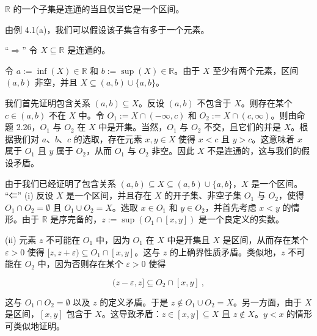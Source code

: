 \begin{theorem}

$ \mathbb{R} $ 的一个子集是连通的当且仅当它是一个区间。

\proofhead
由例 4.1(a)，我们可以假设该子集含有多于一个元素。

“$\Rightarrow$” 令 $X \subseteq \mathbb{R}$ 是连通的。

\begin{subitems}
\item

令 $ a := \inf(X) \in \mathbb{R} $ 和 $ b := \sup(X) \in \mathbb{R} $。由于 $ X $ 至少有两个元素，区间 $ (a, b) $ 非空，并且 $ X \subseteq (a, b) \cup \{a, b\} $。

\item

我们首先证明包含关系 $(a,b) \subseteq X$。反设 $(a,b)$ 不包含于 $X$。则存在某个 $c \in (a,b)$ 不在 $X$ 中。令 $O_1 := X \cap (-\infty, c)$ 和 $O_2 := X \cap (c, \infty)$。则由命题 2.26，$O_1$ 与 $O_2$ 在 $X$ 中是开集。当然，$O_1$ 与 $O_2$ 不交，且它们的并是 $X$。根据我们对 $a$、$b$、$c$ 的选取，存在元素 $x, y \in X$ 使得 $x < c$ 且 $y > c$。这意味着 $x$ 属于 $O_1$ 且 $y$ 属于 $O_2$，从而 $O_1$ 与 $O_2$ 非空。因此 $X$ 不是连通的，这与我们的假设矛盾。

\item

由于我们已经证明了包含关系 $(a,b)\subseteq X\subseteq(a,b)\cup\{a,b\}$，$X$ 是一个区间。
“⇐” (i) 反设 $X$ 是一个区间，并且存在 $X$ 的开子集、非空子集 $O_1$ 与 $O_2$，使得 $O_1 \cap O_2 = \emptyset$ 且 $O_1 \cup O_2 = X$。选取 $x \in O_1$ 和 $y \in O_2$，并首先考虑 $x < y$ 的情形。由于 $\mathbb{R}$ 是序完备的，$z := \sup(O_1 \cap [x, y])$ 是一个良定义的实数。

\end{subitems}

(ii) 元素 $z$ 不可能在 $O_1$ 中，因为 $O_1$ 在 $X$ 中是开集且 $X$ 是区间，从而存在某个 $\varepsilon > 0$ 使得 $[z, z + \varepsilon) \subseteq O_1 \cap [x, y]$。这与 $z$ 的上确界性质矛盾。类似地，$z$ 不可能在 $O_2$ 中，因为否则存在某个 $\varepsilon > 0$ 使得

\[
(z-\varepsilon,z]\subseteq O_{2}\cap[x,y]~,
\]

这与 $ O_1 \cap O_2 = \emptyset $ 以及 $ z $ 的定义矛盾。于是 $ z \notin O_1 \cup O_2 = X $。另一方面，由于 $ X $ 是区间，$ [x, y] $ 包含于 $ X $。这导致矛盾：$ z \in [x, y] \subseteq X $ 且 $ z \notin X $。$ y < x $ 的情形可类似地证明。

\end{theorem}

